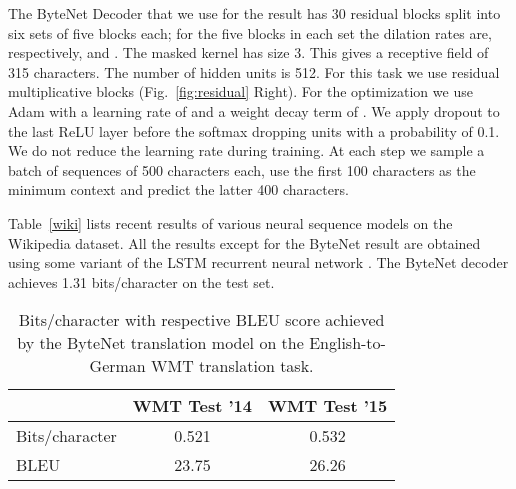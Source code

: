 \documentclass{article}
\newcommand{\figref}[1]{Fig.~\ref{#1}}
\begin{document}
The ByteNet Decoder that we use for the result has 30 residual blocks split into six sets of five blocks each; for the five blocks in each set the dilation rates are, respectively,  and . The masked kernel has size 3. This gives a receptive field of 315 characters. The number of hidden units  is 512.  For this task we use residual multiplicative blocks  (\figref{fig:residual} Right).
For the optimization we use Adam \citep{DBLP:journals/corr/KingmaB14} with a learning rate of  and a weight decay term of . We apply dropout to the last ReLU layer before the softmax dropping units with a probability of 0.1. We do not reduce the learning rate during training. At each step we sample a batch of sequences of 500 characters each, use the first 100 characters as the minimum context and predict the latter 400 characters.


Table~\ref{wiki} lists recent results of various neural sequence models on the Wikipedia dataset. All the results except for the ByteNet result are obtained using some variant of the LSTM recurrent neural network \citep{hochreiter1997long}. The ByteNet decoder achieves 1.31 bits/character on the test set.







\begin{table}[t]
\small
  \begin{center}
  \begin{tabular}{lcc}
    \toprule
      & \textbf{WMT Test '14} & \textbf{WMT Test '15} \\ \midrule
      Bits/character & 0.521 & 0.532  \\ \midrule
      BLEU & 23.75 & 26.26 \\
      \bottomrule
  \end{tabular}
  \end{center}
\caption{Bits/character with respective BLEU score achieved by the ByteNet translation model on the English-to-German WMT translation task.}
\label{nllresults}
\end{table}
\end{document}

